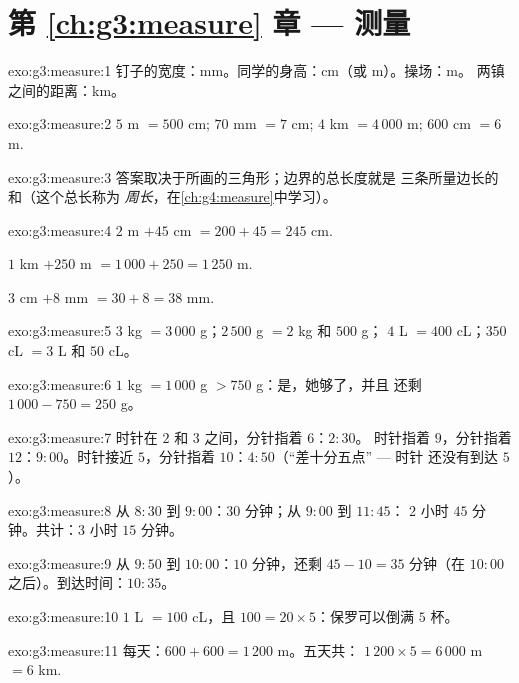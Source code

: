\section*{第 \ref{ch:g3:measure} 章 --- 测量}

\begin{solution}{exo:g3:measure:1}
钉子的宽度：mm。同学的身高：cm（或 m）。操场：m。
两镇之间的距离：km。
\end{solution}

\begin{solution}{exo:g3:measure:2}
$5$ m $= 500$ cm; \quad $70$ mm $= 7$ cm; \quad
$4$ km $= 4\,000$ m; \quad $600$ cm $= 6$ m.
\end{solution}

\begin{solution}{exo:g3:measure:3}
答案取决于所画的三角形；边界的总长度就是
三条所量边长的和（这个总长称为
\emph{周长}，在\cref{ch:g4:measure}中学习）。
\end{solution}

\begin{solution}{exo:g3:measure:4}
$2$ m $+ 45$ cm $= 200 + 45 = 245$ cm.

$1$ km $+ 250$ m $= 1\,000 + 250 = 1\,250$ m.

$3$ cm $+ 8$ mm $= 30 + 8 = 38$ mm.
\end{solution}

\begin{solution}{exo:g3:measure:5}
$3$ kg $= 3\,000$ g；\quad $2\,500$ g $= 2$ kg 和 $500$ g；\quad
$4$ L $= 400$ cL；\quad $350$ cL $= 3$ L 和 $50$ cL。
\end{solution}

\begin{solution}{exo:g3:measure:6}
$1$ kg $= 1\,000$ g $> 750$ g：是，她够了，并且
还剩 $1\,000 - 750 = 250$ g。
\end{solution}

\begin{solution}{exo:g3:measure:7}
时针在 $2$ 和 $3$ 之间，分针指着 $6$：$2{:}30$。
时针指着 $9$，分针指着 $12$：$9{:}00$。时针接近
$5$，分针指着 $10$：$4{:}50$（“差十分五点” --- 时针
还没有到达 $5$）。
\end{solution}

\begin{solution}{exo:g3:measure:8}
从 $8{:}30$ 到 $9{:}00$：$30$ 分钟；从 $9{:}00$ 到 $11{:}45$：
$2$ 小时 $45$ 分钟。共计：$3$ 小时 $15$ 分钟。
\end{solution}

\begin{solution}{exo:g3:measure:9}
从 $9{:}50$ 到 $10{:}00$：$10$ 分钟，还剩
$45 - 10 = 35$ 分钟（在 $10{:}00$ 之后）。到达时间：$10{:}35$。
\end{solution}

\begin{solution}{exo:g3:measure:10}
$1$ L $= 100$ cL，且 $100 = 20 \times 5$：保罗可以倒满
$5$ 杯。
\end{solution}

\begin{solution}{exo:g3:measure:11}
每天：$600 + 600 = 1\,200$ m。五天共：
$1\,200 \times 5 = 6\,000$ m $= 6$ km.
\end{solution}

